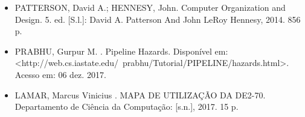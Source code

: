 \documentclass{vgtc}                          %
\begin{document}
\begin{itemize}
\item PATTERSON, David A.; HENNESY, John. Computer Organization and Design. 5. ed. [S.l.]: David A. Patterson And John LeRoy Hennesy, 2014. 856 p.
\item PRABHU, Gurpur M. . Pipeline Hazards. Disponível em: <http://web.cs.iastate.edu/~prabhu/Tutorial/PIPELINE/hazards.html>. Acesso em: 06 dez. 2017.
\item LAMAR, Marcus Vinicius . MAPA DE UTILIZAÇÃO DA DE2-70. Departamento de Ciência da Computação: [s.n.], 2017. 15 p.
\end{itemize}




\end{document}
